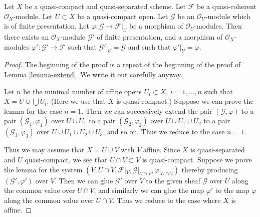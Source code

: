 \begin{lemma}
\label{lemma-extend-finite-presentation}
Let $X$ be a quasi-compact and quasi-separated scheme.
Let $\mathcal{F}$ be a quasi-coherent $\mathcal{O}_X$-module.
Let $U \subset X$ be a quasi-compact open.
Let $\mathcal{G}$ be an $\mathcal{O}_U$-module which is of finite presentation.
Let $\varphi : \mathcal{G} \to \mathcal{F}|_U$ be a morphism of
$\mathcal{O}_U$-modules.
Then there exists an $\mathcal{O}_X$-module
$\mathcal{G}'$ of finite presentation, and a morphism
of $\mathcal{O}_X$-modules $\varphi' : \mathcal{G}' \to \mathcal{F}$
such that $\mathcal{G}'|_U = \mathcal{G}$ and such that
$\varphi'|_U = \varphi$.
\end{lemma}

\begin{proof}
The beginning of the proof is a repeat of the beginning of the
proof of Lemma \ref{lemma-extend}. We write it out carefully anyway.

\medskip\noindent
Let $n$ be the minimal number of affine opens $U_i \subset X$,
$i = 1, \ldots , n$ such that $X = U \cup \bigcup U_i$.
(Here we use that $X$ is quasi-compact.) Suppose
we can prove the lemma for the case $n = 1$. Then we can successively
extend the pair $(\mathcal{G}, \varphi)$
to a pair $(\mathcal{G}_1, \varphi_1)$ over $U \cup U_1$
to a pair $(\mathcal{G}_2, \varphi_2)$ over $U \cup U_1 \cup U_2$
to a pair $(\mathcal{G}_3, \varphi_3)$ over $U \cup U_1 \cup U_2 \cup U_3$,
and so on.
Thus we reduce to the case $n = 1$.

\medskip\noindent
Thus we may assume that $X = U \cup V$ with $V$ affine.
Since $X$ is quasi-separated and $U$ quasi-compact,
we see that $U \cap V \subset V$ is quasi-compact.
Suppose we prove the lemma for the system
$(V, U \cap V, \mathcal{F}|_V, \mathcal{G}|_{U \cap V}, \varphi|_{U \cap V})$
thereby producing $(\mathcal{G}', \varphi')$ over $V$.
Then we can glue $\mathcal{G}'$ over $V$ to the given sheaf $\mathcal{G}$
over $U$ along the common value over $U \cap V$, and similarly we can glue
the map $\varphi'$ to the map $\varphi$ along the common value over
$U \cap V$. Thus we reduce to the case where $X$ is affine.


\end{proof}
